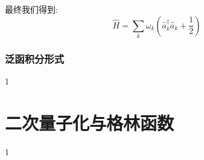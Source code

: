 最终我们得到:
\begin{equation}
	\hat{H}=\sum_k\omega_k\left(\hat{a}_k^\dagger\hat{a}_k+\frac{1}{2}\right)
\end{equation}






\subsubsection{泛函积分形式}
1
\section{二次量子化与格林函数}
1


















































	
\ifx\allfiles\undefined

	\else
	\fi

